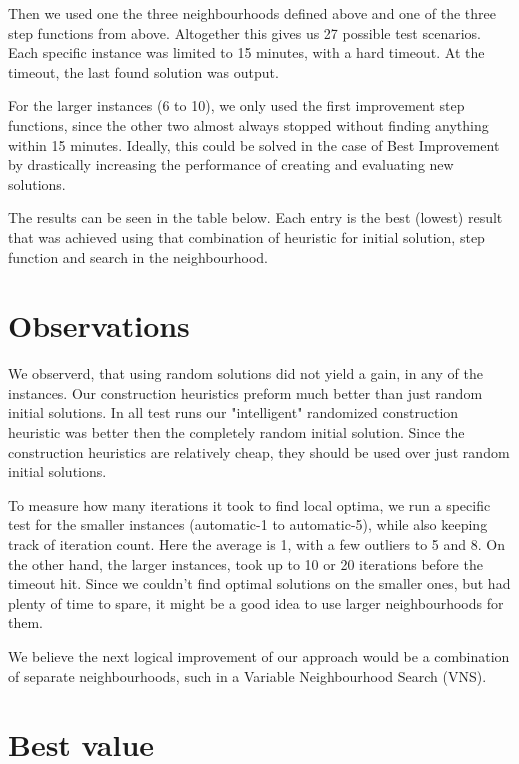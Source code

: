 \documentclass [11pt]{article}
\begin{document}
Then we used one the three neighbourhoods defined above and one of the three step functions from above. Altogether this gives us 27 possible test scenarios.  Each specific instance was limited to 15 minutes, with a hard timeout. At the timeout, the last found solution was output. 

For the larger instances (6 to 10), we only used the first improvement step functions, since the other two almost always stopped without finding anything within 15 minutes. Ideally, this could be solved in the case of Best Improvement by drastically increasing the performance of creating and evaluating new solutions. 

The results can be seen in the table below. Each entry is the best (lowest) result that was achieved using that combination of heuristic for initial solution, step function and search in the neighbourhood. 

\section{Observations}
We observerd, that using random solutions did not yield a gain, in any of the instances. Our construction heuristics preform much better than just random initial solutions. In all test runs our "intelligent" randomized construction heuristic was better then the completely random initial solution.  Since the construction heuristics are relatively cheap, they should be used over just random initial solutions.

To measure how many iterations it took to find local optima, we run a specific test for the smaller instances (automatic-1 to automatic-5), while also keeping track of iteration count. Here the average is 1, with a few outliers to 5 and 8. On the other hand, the larger instances, took up to 10 or 20 iterations before the timeout hit. Since we couldn't find optimal solutions on the smaller ones, but had plenty of time to spare, it might be a good idea to use larger neighbourhoods for them. 

We believe the next logical improvement of our approach would be a combination of separate neighbourhoods, such in a Variable Neighbourhood Search (VNS). 

\section{Best value}
\end{document}

